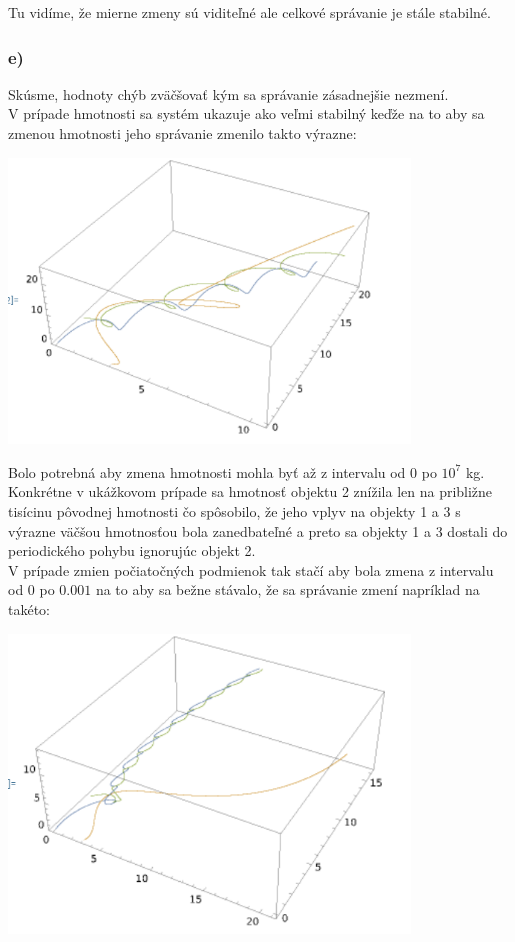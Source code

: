 \documentclass[a4paper]{article}
\begin{document}
	Tu vidíme, že mierne zmeny sú viditeľné ale celkové správanie je stále stabilné.
	
	\subsubsection{e)}
	
	Skúsme, hodnoty chýb zväčšovať kým sa správanie zásadnejšie nezmení.
	\\
	
	V prípade hmotnosti sa systém ukazuje ako veľmi stabilný keďže na to aby sa zmenou hmotnosti jeho správanie zmenilo takto výrazne:
	
	\centerline{\includegraphics[width=0.8\textwidth]{pohyb_6}}
	
	Bolo potrebná aby zmena hmotnosti mohla byť až z intervalu od $0$ po $10^7$ kg. Konkrétne v ukážkovom prípade sa hmotnosť objektu 2 znížila len na približne tisícinu pôvodnej hmotnosti čo spôsobilo, že jeho vplyv na objekty 1 a 3 s výrazne väčšou hmotnosťou bola zanedbateľné a preto sa objekty 1 a 3 dostali do periodického pohybu ignorujúc objekt 2.
	\\ 
	
	V prípade zmien počiatočných podmienok tak stačí aby bola zmena z intervalu od $0$ po $0.001$ na to aby sa bežne stávalo, že sa správanie zmení napríklad na takéto:
	
	\centerline{\includegraphics[width=0.8\textwidth]{pohyb_7}}
	
\end{document}
